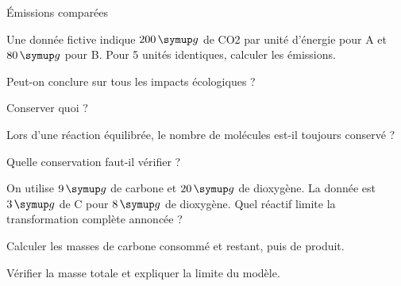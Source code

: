 \par\noindent\begin{minipage}{\linewidth}
\begin{exercice}[3]{Émissions comparées}
\begin{questions}
\item Une donnée fictive indique $200\unite g$ de CO2 par unité d’énergie pour A et $80\unite g$ pour B. Pour 5 unités identiques, calculer les émissions.
\item Peut-on conclure sur tous les impacts écologiques ?
\end{questions}
\end{exercice}
\end{minipage}
\par\noindent\begin{minipage}{\linewidth}
\begin{exercice}[3]{Conserver quoi ?}
\begin{questions}
\item Lors d’une réaction équilibrée, le nombre de molécules est-il toujours conservé ?
\item Quelle conservation faut-il vérifier ?
\end{questions}
\end{exercice}
\end{minipage}
\label{defi-ex-6}
\begin{questions}
\item On utilise $9\unite g$ de carbone et $20\unite g$ de dioxygène. La donnée est $3\unite g$ de C pour $8\unite g$ de dioxygène. Quel réactif limite la transformation complète annoncée ?
\item Calculer les masses de carbone consommé et restant, puis de produit.
\item Vérifier la masse totale et expliquer la limite du modèle.
\end{questions}
\pcGrille
